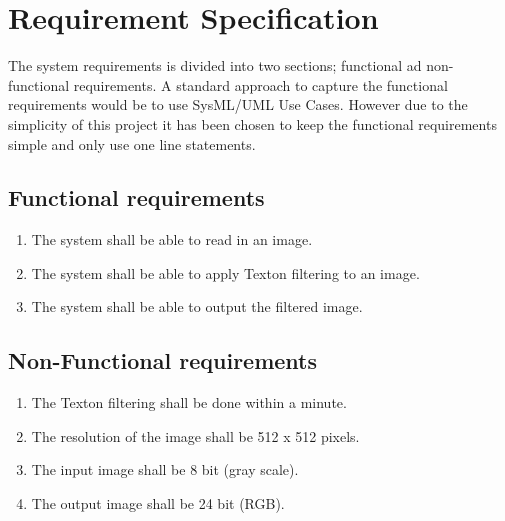 \chapter{Requirement Specification}
The system requirements is divided into two sections; functional ad non-functional requirements. A standard approach to capture the functional requirements would be to use SysML/UML Use Cases. However due to the simplicity of this project it has been chosen to keep the functional requirements simple and only use one line statements. 

\section{Functional requirements}
\begin{enumerate}[label=1.\arabic*]
	\item The system shall be able to read in an image.
	\item The system shall be able to apply Texton filtering to an image.
	\item The system shall be able to output the filtered image.
\end{enumerate}


\section{Non-Functional requirements}
\begin{enumerate}[label=2.\arabic*]
	\item The Texton filtering shall be done within a minute.
	\item The resolution of the image shall be 512 x 512 pixels.
	\item The input image shall be 8 bit (gray scale).
	\item The output image shall be 24 bit (RGB).
\end{enumerate}